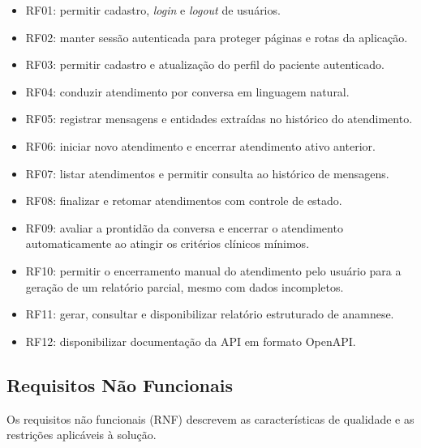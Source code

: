 \begin{itemize}
\item RF01: permitir cadastro, \textit{login} e \textit{logout} de usuários.
\item RF02: manter sessão autenticada para proteger páginas e rotas da aplicação.
\item RF03: permitir cadastro e atualização do perfil do paciente autenticado.
\item RF04: conduzir atendimento por conversa em linguagem natural.
\item RF05: registrar mensagens e entidades extraídas no histórico do atendimento.
\item RF06: iniciar novo atendimento e encerrar atendimento ativo anterior.
\item RF07: listar atendimentos e permitir consulta ao histórico de mensagens.
\item RF08: finalizar e retomar atendimentos com controle de estado.
\item RF09: avaliar a prontidão da conversa e encerrar o atendimento automaticamente ao atingir os critérios clínicos mínimos.
\item RF10: permitir o encerramento manual do atendimento pelo usuário para a geração de um relatório parcial, mesmo com dados incompletos.
\item RF11: gerar, consultar e disponibilizar relatório estruturado de anamnese.
\item RF12: disponibilizar documentação da API em formato OpenAPI.
\end{itemize}

\subsection{Requisitos Não Funcionais}

Os requisitos não funcionais (RNF) descrevem as características de qualidade e as restrições
aplicáveis à solução.


